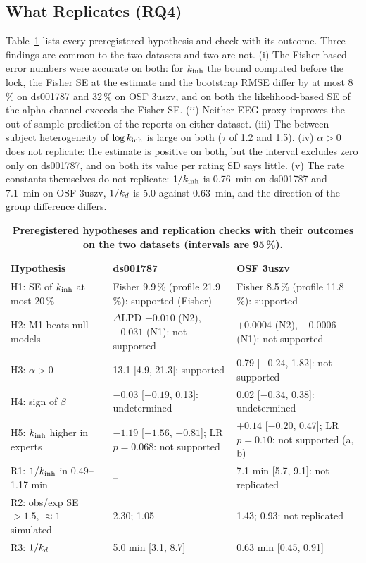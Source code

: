 \subsection{What Replicates (RQ4)}
Table~\ref{tab:tests} lists every preregistered hypothesis and check with its outcome. Three findings are common to the two datasets and two are not. (i) The Fisher-based error numbers were accurate on both: for $k_{\mathrm{inh}}$ the bound computed before the lock, the Fisher SE at the estimate and the bootstrap RMSE differ by at most 8\,\% on ds001787 and 32\,\% on OSF 3uszv, and on both the likelihood-based SE of the alpha channel exceeds the Fisher SE. (ii) Neither EEG proxy improves the out-of-sample prediction of the reports on either dataset. (iii) The between-subject heterogeneity of $\log k_{\mathrm{inh}}$ is large on both ($\tau$ of 1.2 and 1.5). (iv) $\alpha>0$ does not replicate: the estimate is positive on both, but the interval excludes zero only on ds001787, and on both its value per rating SD says little. (v) The rate constants themselves do not replicate: $1/k_{\mathrm{inh}}$ is 0.76~min on ds001787 and 7.1~min on OSF 3uszv, $1/k_{d}$ is 5.0 against 0.63~min, and the direction of the group difference differs.

\begin{table}[t]
\caption{\textbf{Preregistered hypotheses and replication checks with their outcomes on the two datasets (intervals are 95\,\%).}}
\label{tab:tests}
\centering\footnotesize
\setlength{\tabcolsep}{3pt}
\begin{tabular}{lll}
\toprule
Hypothesis & ds001787 & OSF 3uszv \\
\midrule
H1: SE of $k_{\mathrm{inh}}$ at most 20\,\% & Fisher 9.9\,\% (profile 21.9\,\%): supported (Fisher) & Fisher 8.5\,\% (profile 11.8\,\%): supported \\
H2: M1 beats null models & $\Delta$LPD $-0.010$ (N2), $-0.031$ (N1): not supported & $+0.0004$ (N2), $-0.0006$ (N1): not supported \\
H3: $\alpha>0$ & 13.1 [4.9, 21.3]: supported & 0.79 [$-0.24$, 1.82]: not supported \\
H4: sign of $\beta$ & $-0.03$ [$-0.19$, 0.13]: undetermined & 0.02 [$-0.34$, 0.38]: undetermined \\
H5: $k_{\mathrm{inh}}$ higher in experts & $-1.19$ [$-1.56$, $-0.81$]; LR $p=0.068$: not supported & $+0.14$ [$-0.20$, 0.47]; LR $p=0.10$: not supported (a, b) \\
R1: $1/k_{\mathrm{inh}}$ in 0.49--1.17 min & -- & 7.1 min [5.7, 9.1]: not replicated \\
R2: obs/exp SE $>1.5$, $\approx1$ simulated & 2.30; 1.05 & 1.43; 0.93: not replicated \\
R3: $1/k_{d}$ & 5.0 min [3.1, 8.7] & 0.63 min [0.45, 0.91] \\
\bottomrule
\end{tabular}
\end{table}

